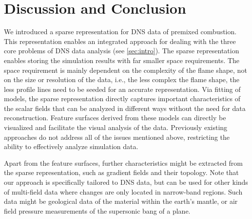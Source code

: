 
%
\section{Discussion and Conclusion}
\label{sec:conclusion}
%
We introduced a sparse representation for \ac{DNS} data of premixed combustion. This
representation enables an integrated approach for dealing with the three core
problems of \ac{DNS} data analysis (see \cref{sec:intro}). The sparse
representation enables storing the simulation results with far smaller space
requirements. The space requirement is mainly dependent on the complexity of the
flame shape, not on the size or resolution of the data, i.e., the less complex
the flame shape, the less profile lines need to be seeded for an accurate
representation. Via fitting of models, the sparse representation directly
captures important characteristics of the scalar fields that can be analyzed in
different ways without the need for data reconstruction. Feature surfaces
derived from these models can directly be visualized and facilitate the visual
analysis of the data. Previously existing approaches do not address all of the
issues mentioned above, restricting the ability to effectively analyze
simulation data.


Apart from the feature surfaces, further characteristics might be extracted from
the sparse representation, such as gradient fields and their topology.
Note that our approach is specifically tailored to \ac{DNS} data, but can be used
for other kinds of multi-field data where changes are only located in 
narrow-band regions. Such data might be geological data of the material within
the earth's mantle, or air field pressure measurements of the supersonic bang of
a plane.

